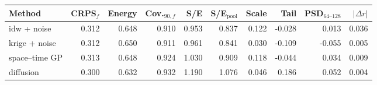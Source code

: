 \begin{tabular}{lrrrrrrrrr}
\toprule
Method & CRPS$_f$ & Energy & Cov.$_{90,f}$ & S/E & S/E$_\mathrm{pool}$ & Scale & Tail & PSD$_{64\text{--}128}$ & $|\Delta r|$ \\
\midrule
idw + noise & 0.312 & 0.648 & 0.910 & 0.953 & 0.837 & 0.122 & -0.028 & 0.013 & 0.036 \\
krige + noise & 0.312 & 0.650 & 0.911 & 0.961 & 0.841 & 0.030 & -0.109 & -0.055 & 0.005 \\
space–time GP & 0.313 & 0.648 & 0.924 & 1.030 & 0.909 & 0.118 & -0.044 & 0.034 & 0.009 \\
diffusion & 0.300 & 0.632 & 0.932 & 1.190 & 1.076 & 0.046 & 0.186 & 0.052 & 0.004 \\
\bottomrule
\end{tabular}
